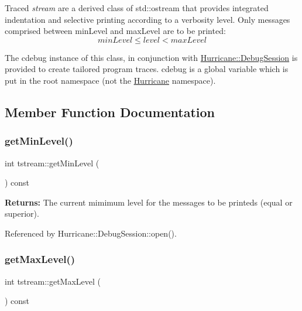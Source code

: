 Traced {\itshape stream} are a derived class of std\+::ostream that provides integrated indentation and selective printing according to a verbosity level. Only messages comprised between {\ttfamily min\+Level} and {\ttfamily max\+Level} are to be printed\+: \[ minLevel \leq level < maxLevel \]

The cdebug instance of this class, in conjunction with \mbox{\hyperlink{classHurricane_1_1DebugSession}{Hurricane\+::\+Debug\+Session}} is provided to create tailored program traces. cdebug is a global variable which is put in the root namespace (not the \mbox{\hyperlink{namespaceHurricane}{Hurricane}} namespace). 

\subsection{Member Function Documentation}
\mbox{\label{clasststream_a86cfc3fc7bfa7d0064d27dea74d6888d}} 
\subsubsection{\texorpdfstring{get\+Min\+Level()}{getMinLevel()}}
{\footnotesize\ttfamily int tstream\+::get\+Min\+Level (\begin{DoxyParamCaption}{ }\end{DoxyParamCaption}) const\hspace{0.3cm}{\ttfamily [inline]}}

{\bfseries Returns\+:} The current mimimum level for the messages to be printeds (equal or superior). 

Referenced by Hurricane\+::\+Debug\+Session\+::open().

\mbox{\label{clasststream_abb7ecc2e0ddeab5442d52acb2ea5fd64}} 
\subsubsection{\texorpdfstring{get\+Max\+Level()}{getMaxLevel()}}
{\footnotesize\ttfamily int tstream\+::get\+Max\+Level (\begin{DoxyParamCaption}{ }\end{DoxyParamCaption}) const\hspace{0.3cm}{\ttfamily [inline]}}

